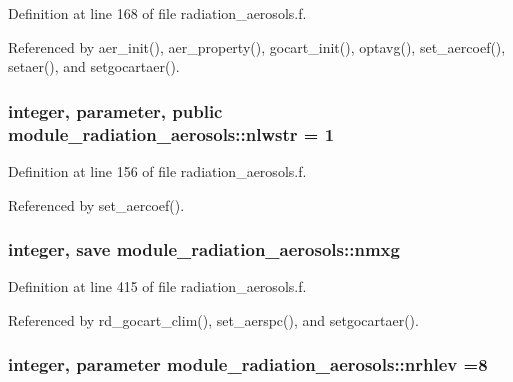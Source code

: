 Definition at line 168 of file radiation\+\_\+aerosols.\+f.



Referenced by aer\+\_\+init(), aer\+\_\+property(), gocart\+\_\+init(), optavg(), set\+\_\+aercoef(), setaer(), and setgocartaer().

\subsubsection[{\texorpdfstring{nlwstr}{nlwstr}}]{\setlength{\rightskip}{0pt plus 5cm}integer, parameter, public module\+\_\+radiation\+\_\+aerosols\+::nlwstr = 1}\hypertarget{group__module__radiation__aerosols_ga654ab60d433133542d3c07edd2244566}{}\label{group__module__radiation__aerosols_ga654ab60d433133542d3c07edd2244566}


Definition at line 156 of file radiation\+\_\+aerosols.\+f.



Referenced by set\+\_\+aercoef().

\subsubsection[{\texorpdfstring{nmxg}{nmxg}}]{\setlength{\rightskip}{0pt plus 5cm}integer, save module\+\_\+radiation\+\_\+aerosols\+::nmxg\hspace{0.3cm}{\ttfamily [private]}}\hypertarget{group__module__radiation__aerosols_gadb4c4cdc8e3212777229d1f54e79bb05}{}\label{group__module__radiation__aerosols_gadb4c4cdc8e3212777229d1f54e79bb05}


Definition at line 415 of file radiation\+\_\+aerosols.\+f.



Referenced by rd\+\_\+gocart\+\_\+clim(), set\+\_\+aerspc(), and setgocartaer().

\subsubsection[{\texorpdfstring{nrhlev}{nrhlev}}]{\setlength{\rightskip}{0pt plus 5cm}integer, parameter module\+\_\+radiation\+\_\+aerosols\+::nrhlev =8\hspace{0.3cm}{\ttfamily [private]}}\hypertarget{group__module__radiation__aerosols_gaa6d18b0588e80cb40871cc75870d09ba}{}\label{group__module__radiation__aerosols_gaa6d18b0588e80cb40871cc75870d09ba}


